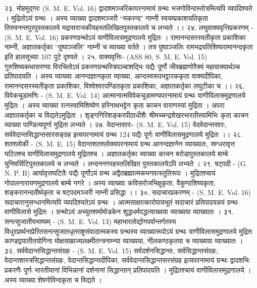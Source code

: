 २३. मोहमुद्गरः (S. M. E. Vol. 16)
द्वादशमञ्जरिकापरनामायं ग्रन्थः भजगोविन्दस्तोत्रमित्यपि व्यपदिश्यते । मुद्रितोऽयं ग्रन्थः । अस्य व्याख्या द्वादशमञ्जरी ``मकरन्द" नाम्नी स्वयम्प्रकाशयतिकृता तिरुवनन्तपुरपुस्तकालये मद्रासराजकीयहस्तलिखितपुस्तकालये च लभ्यते ।।
२४. लघुवाक्यवृत्तिप्रकरणम् - (S. M. E. Vol. 16)
प्रकरणग्रन्थोऽयं वाणीविलासमुद्रणालये मुद्रितः । रामानन्दसरस्वतीकृता प्रकाशिका नाम्नी, अज्ञातकर्तृका ``पुष्पाञ्जलि" नाम्नी च व्याख्या वर्तते । तत्र पुष्पाञ्जलिः रामभद्रयतिशिष्यरामानन्दकृता इति हालसूच्याः 107 पुटे दृश्यते ।
२५. वाक्यवृत्तिः- (ASS 80, S. M. E. Vol. 15)
गुरुशिष्यकथासरण्या विरचितोऽयं प्रकरणग्रन्थस्त्रिपञ्चाशद्भिः पद्यैः पूर्णो जीवब्रह्मणोरैक्यं महावाक्यार्थञ्च प्रतिपादयति । अस्य व्याख्याः आनन्दज्ञानकृता व्याख्या, आन्दस्वरूपभट्टारककृता वाक्यदीपिका, रामानन्दसरस्वतीकृता प्रकाशिका, विश्वेश्वरपण्डितकृता प्रकाशिका, अज्ञातकर्तृका लघुटीका च ।।
२६. विवेकचूडामणिः - (S. M. E. Vol. 14)
आत्मानात्मविवेकचूडामण्यपरनामायं ग्रन्थः वाणीविलासमुद्रणालये मुद्रितः । अस्य व्याख्या रत्नस्वामिशिष्येण हरिनाथभट्टेन कृता काचन वाराणस्यां मुद्रिता । अपरा अज्ञातकर्तृका च विद्यतेऽमुद्रिता । शृङ्गगिरिशङ्करपीठाधीशैः श्रीमच्चन्द्रशेखरभारतीस्वामिभिः कृता काचन व्याख्या पाण्डित्यपूर्णा मुद्रिता लभ्यते ।
२७. वेदान्तसारः- (S. M. E. Vol. 15)
वेदवेदान्तसारः, सर्ववेदान्तसिद्धान्तसारसङ्ग्रह इत्यपरनामायं ग्रन्थः 124 पद्यैः पूर्णः वाणीविलासमुद्रणालये मुद्रितः ।।
२८. शतश्लोकी - (S. M. E. 15)
वेदान्तशतश्लोक्यपरनामायं ग्रन्थ आनन्दज्ञानेन व्याख्यातः, स्रग्धरावृत्त घटितश्च वाणीविलासमुद्रणालये मुद्रितश्च । अज्ञातकर्तृका व्याख्या काचन बरोडापुस्तकालये बाम्बे युनिवर्सिटिपुस्तकालये च लभ्यते । लन्दननगरहस्तलिखित पुस्तकालयेऽपि लभ्यते ।
२९. षट्पदी - (G. N. P. B)
आर्यावृत्तघटितैः पद्यैः पूर्णोऽयं ग्रन्थ अद्वैतब्रह्मात्मकभगवत्स्तुतिरूपः । मुद्रितश्चायं गोपालनारायणमुद्रणालये बाम्बे नगरे । अस्य व्याख्याः कविसरोजभिक्षुकृता, वैकुण्ठशिष्यकृता, शङ्करानन्दतीर्थकृता च षट्पदमञ्जरी नाम्नी प्रसिद्धा ।।
३०. सदाचारप्रकरणम् - (S. M. E. Vol. 16)
सदाचारानुसन्धानमित्यपि व्यपदिश्यतेऽयं ग्रन्थः । आत्मसाक्षात्कारोपायभूतं सदाचारं प्रतिपादयन्नयं ग्रन्थः वाणीविलासे मुद्रितः । ग्रन्थोऽयं अच्युतशर्मामोडकेन शुद्धधर्मपद्धत्याख्यया व्याख्यया व्याख्यातः ।
३१. सनत्सुजातीयभाष्यम् - (S. M. E. Vol. 13)
महाभारतोद्योगपर्वान्तर्गतस्य विधुरप्रार्थनाप्रेरितसनत्सुजातधृतराष्ट्रसंवादात्मकस्य ग्रन्थस्य व्याख्यारूपोऽयं ग्रन्थः वाणीविलासमुद्रणालये मुद्रितः काण्डद्वयातीतयोगिना मोक्षसाम्राज्यलक्ष्मीतन्त्रनाम्न्या व्याख्यया, नीलकण्ठकृतया च व्याख्यया व्याख्यातः ।
३२. सर्ववेदान्तसिद्धान्तसंग्रहः - (S. M. E. Vol. 15)
सर्वदर्शनसिद्धान्तः, सर्वसिद्धान्तसंग्रहः, वेदान्तशास्त्रसिद्धान्तसंग्रहः, वेदान्तसिद्धान्तदीपिका, सर्ववेदान्तसिद्धान्तसरसंग्रह इत्यपरनामायं ग्रन्थः द्वादशभिः प्रकरणैः पूर्णः भारतीयानां विभिन्नानां दर्शनानां सिद्धान्तान् प्रतिपादयति । मुद्रितश्चायं वाणीविलासमुद्रणालये । अस्य व्याख्या शेषगोविन्दकृता च विद्यते ।
